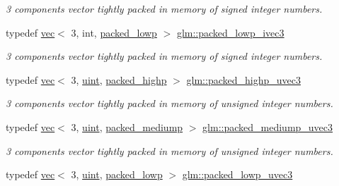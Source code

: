 \begin{DoxyCompactItemize}
\begin{DoxyCompactList}\small\item\em 3 components vector tightly packed in memory of signed integer numbers. \end{DoxyCompactList}\item 
typedef \mbox{\hyperlink{structglm_1_1vec}{vec}}$<$ 3, int, \mbox{\hyperlink{namespaceglm_a36ed105b07c7746804d7fdc7cc90ff25ac36a4bd74559be2c0b65bc48e5953b8b}{packed\+\_\+lowp}} $>$ \mbox{\hyperlink{group__gtc__type__aligned_gac0de36c7d01951895c5e227817508a15}{glm\+::packed\+\_\+lowp\+\_\+ivec3}}
\begin{DoxyCompactList}\small\item\em 3 components vector tightly packed in memory of signed integer numbers. \end{DoxyCompactList}\item 
typedef \mbox{\hyperlink{structglm_1_1vec}{vec}}$<$ 3, \mbox{\hyperlink{group__core__precision_ga4fd29415871152bfb5abd588334147c8}{uint}}, \mbox{\hyperlink{namespaceglm_a36ed105b07c7746804d7fdc7cc90ff25a8e8791ee77fe079b1291f710d88031bf}{packed\+\_\+highp}} $>$ \mbox{\hyperlink{group__gtc__type__aligned_ga607425d3ca2ad292b115d09aef19e372}{glm\+::packed\+\_\+highp\+\_\+uvec3}}
\begin{DoxyCompactList}\small\item\em 3 components vector tightly packed in memory of unsigned integer numbers. \end{DoxyCompactList}\item 
typedef \mbox{\hyperlink{structglm_1_1vec}{vec}}$<$ 3, \mbox{\hyperlink{group__core__precision_ga4fd29415871152bfb5abd588334147c8}{uint}}, \mbox{\hyperlink{namespaceglm_a36ed105b07c7746804d7fdc7cc90ff25a9604654c3b137cd7898689fd34b25bc0}{packed\+\_\+mediump}} $>$ \mbox{\hyperlink{group__gtc__type__aligned_gaa79317c123076b994c5c1b46a5b41351}{glm\+::packed\+\_\+mediump\+\_\+uvec3}}
\begin{DoxyCompactList}\small\item\em 3 components vector tightly packed in memory of unsigned integer numbers. \end{DoxyCompactList}\item 
typedef \mbox{\hyperlink{structglm_1_1vec}{vec}}$<$ 3, \mbox{\hyperlink{group__core__precision_ga4fd29415871152bfb5abd588334147c8}{uint}}, \mbox{\hyperlink{namespaceglm_a36ed105b07c7746804d7fdc7cc90ff25ac36a4bd74559be2c0b65bc48e5953b8b}{packed\+\_\+lowp}} $>$ \mbox{\hyperlink{group__gtc__type__aligned_ga895469f176463355d8b0a4bd8a4eaf45}{glm\+::packed\+\_\+lowp\+\_\+uvec3}}

\end{DoxyCompactItemize}
